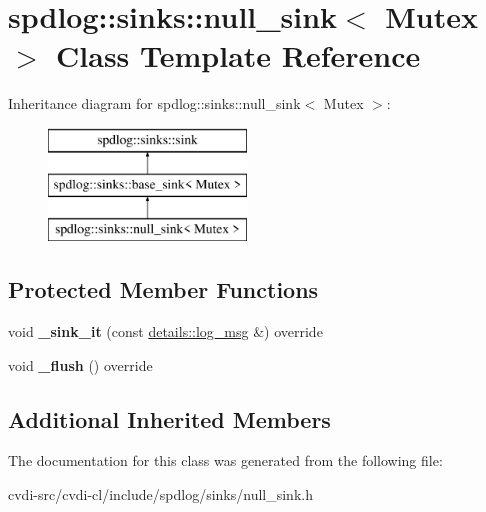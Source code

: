 \hypertarget{classspdlog_1_1sinks_1_1null__sink}{}\section{spdlog\+:\+:sinks\+:\+:null\+\_\+sink$<$ Mutex $>$ Class Template Reference}
\label{classspdlog_1_1sinks_1_1null__sink}
Inheritance diagram for spdlog\+:\+:sinks\+:\+:null\+\_\+sink$<$ Mutex $>$\+:\begin{figure}[H]
\begin{center}
\leavevmode
\includegraphics[height=3.000000cm]{classspdlog_1_1sinks_1_1null__sink}
\end{center}
\end{figure}
\subsection*{Protected Member Functions}
\begin{DoxyCompactItemize}
\item 
void {\bfseries \+\_\+sink\+\_\+it} (const \hyperlink{structspdlog_1_1details_1_1log__msg}{details\+::log\+\_\+msg} \&) override\hypertarget{classspdlog_1_1sinks_1_1null__sink_aa3d6b00b230165fd17c6823665c1c289}{}\label{classspdlog_1_1sinks_1_1null__sink_aa3d6b00b230165fd17c6823665c1c289}

\item 
void {\bfseries \+\_\+flush} () override\hypertarget{classspdlog_1_1sinks_1_1null__sink_af055b5f06592bafa358fb1f7b5830229}{}\label{classspdlog_1_1sinks_1_1null__sink_af055b5f06592bafa358fb1f7b5830229}

\end{DoxyCompactItemize}
\subsection*{Additional Inherited Members}


The documentation for this class was generated from the following file\+:\begin{DoxyCompactItemize}
\item 
cvdi-\/src/cvdi-\/cl/include/spdlog/sinks/null\+\_\+sink.\+h\end{DoxyCompactItemize}
